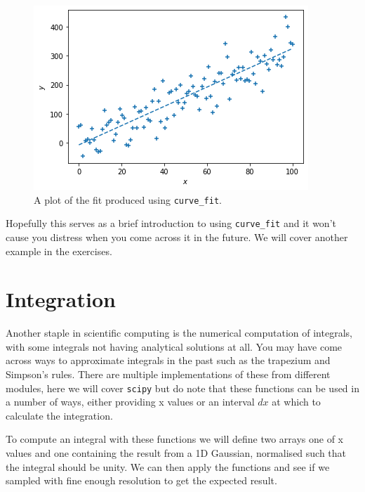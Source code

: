 \begin{figure}[H]
	\centering
	\includegraphics[scale=0.7]{Pictures/fittingexample.png}
\caption{A plot of the fit produced using \texttt{curve\_fit}.}
\label{fig:randimgnoax}
\end{figure}

Hopefully this serves as a brief introduction to using \texttt{curve\_fit} and it won't cause you distress when you come across it in the future. We will cover another example in the exercises.

\newpage

\section{Integration}

Another staple in scientific computing is the numerical computation of integrals, with some integrals not having analytical solutions at all. You may have come across ways to approximate integrals in the past such as the trapezium and Simpson's rules. There are multiple implementations of these from different modules, here we will cover \texttt{scipy} but do note that these functions can be used in a number of ways, either providing x values or an interval $dx$ at which to calculate the integration. 

To compute an integral with these functions we will define two arrays one of x values and one containing the result from a 1D Gaussian, normalised such that the integral should be unity. We can then apply the functions and see if we sampled with fine enough resolution to get the expected result.

